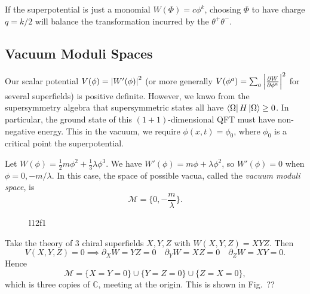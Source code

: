 \begin{example}[monomial]
  If the superpotential is just a monomial $W(\Phi) = c \phi^k$, choosing $\Phi$ to have charge $q = k / 2$ will balance the transformation incurred by the $\theta^+ \theta^-$.
\end{example}

\subsection{Vacuum Moduli Spaces}%

Our scalar potential $V(\phi) = \abs{W'(\phi)}^2$ (or more generally $ V(\phi^a) = \sum_a \abs{\frac{\partial W}{\partial \phi^a}}^2$ for several superfields) is positive definite. However, we knwo from the supersymmetry algebra that supersymmetric states all have $\bra{\Omega} H \ket{\Omega} \geq 0$.
In particular, the ground state of this $(1 + 1)$-dimensional QFT must have non-negative energy. This in the vacuum, we require $\phi(x, t) = \phi_0$, where $\phi_0$ is a critical point the superpotential.

\begin{example}[]
  Let $W (\phi) = \frac{1}{2} m \phi^2 + \frac{1}{3} \lambda \phi^3$. We have $W'(\phi) = m \phi + \lambda \phi^2$, so $W'(\phi) = 0$ when  $\phi = 0, - m / \lambda$.
  In this case, the space of possible vacua, called the \emph{vacuum moduli space}, is 
  \begin{equation}
    \mathcal{M} = \{0, -\frac{m}{\lambda}\}.
  \end{equation}
  \begin{figure}[ht]
    \centering
    \caption{l12f1}
    \label{fig:l12f1}
  \end{figure}
\end{example}

\begin{example}[]
  Take the theory of 3 chiral superfields $X, Y, Z$ with $W(X, Y, Z) = XY Z$.
  Then
  \begin{equation}
    V(X, Y, Z) = 0 \implies \partial_X W = Y Z  = 0 \quad \partial_Y W = X Z = 0 \quad \partial_Z W = X Y = 0.
  \end{equation}
  Hence
  \begin{equation}
    \mathcal{M} = \{X = Y = 0\} \cup \{Y = Z = 0\} \cup \{Z = X = 0\},
  \end{equation}
  which is three copies of $\mathbb{C}$, meeting at the origin. 
  This is shown in Fig.~??
\end{example}
